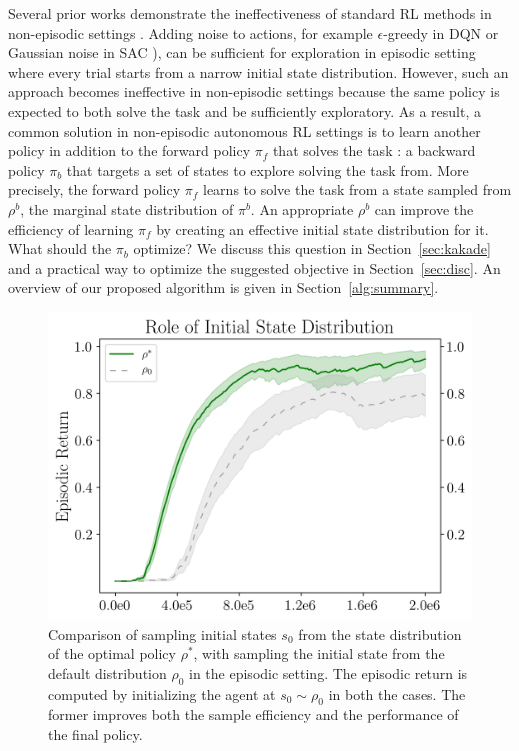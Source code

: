 \documentclass[nohyperref]{article}
\theoremstyle{plain}
\theoremstyle{definition}
\theoremstyle{remark}
\begin{document}
Several prior works demonstrate the ineffectiveness of standard RL methods in non-episodic settings \citep{co2020ecological,zhu20ingredients,sharma2021autonomous}. Adding noise to actions, for example $\epsilon$-greedy in DQN \citep{mnih2015human} or Gaussian noise in SAC \citep{haarnoja2018soft}), can be sufficient for exploration in episodic setting where every trial starts from a narrow initial state distribution. However, such an approach becomes ineffective in non-episodic settings because the same policy is expected to both solve the task and be sufficiently exploratory. As a result, a common solution in non-episodic autonomous RL settings is to learn another policy in addition to the forward policy $\pi_f$ that solves the task \citep{han2015learning, eysenbach2017leave, zhu20ingredients}:
a backward policy $\pi_b$ that targets a set of states to explore solving the task from. More precisely, the forward policy $\pi_f$ learns to solve the task from a state sampled from $\rho^b$, the marginal state distribution of $\pi^b$.
An appropriate $\rho^b$ can improve the efficiency of learning $\pi_f$ by creating an effective initial state distribution for it. What should the $\pi_b$ optimize? We discuss this question in Section~\ref{sec:kakade} and a practical way to optimize the suggested objective in Section~\ref{sec:disc}. An overview of our proposed algorithm is given in Section~\ref{alg:summary}.

\begin{figure}[!h]
    \centering
    \includegraphics[width=0.8\columnwidth]{figures/tabletop_init_state_transfer.png}

    \caption{Comparison of sampling initial states $s_0$ from the state distribution of the optimal policy $\rho^*$, with sampling the initial state from the default distribution $\rho_0$ in the episodic setting. The episodic return is computed by initializing the agent at $s_0 \sim \rho_0$ in both the cases. The former improves both the sample efficiency and the performance of the final policy.}
    \label{fig:init_state}
\end{figure}
\end{document}
